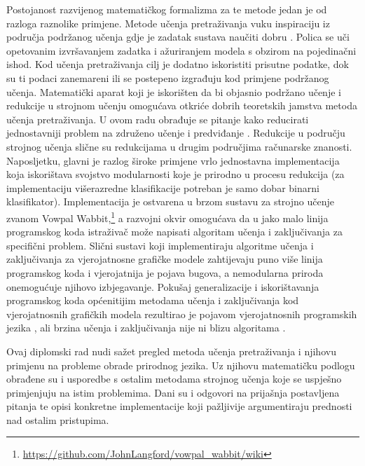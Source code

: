 Postojanost razvijenog matematičkog formalizma za te metode jedan je od razloga
raznolike primjene. Metode učenja pretraživanja vuku inspiraciju iz područja
podržanog učenja  gdje je zadatak sustava naučiti
dobru .
Polica se uči opetovanim izvršavanjem zadatka i ažuriranjem modela s obzirom na
pojedinačni ishod. Kod učenja pretraživanja cilj je dodatno iskoristiti prisutne
podatke, dok su ti podaci zanemareni ili se postepeno izgrađuju kod primjene
podržanog učenja. Matematički aparat koji je iskorišten da bi objasnio podržano
učenje i redukcije u strojnom učenju 
omogućava otkriće dobrih teoretskih jamstva metoda učenja pretraživanja. U ovom
radu obrađuje se pitanje kako reducirati jednostavniji problem na združeno
učenje i predviđanje . Redukcije u području
strojnog učenja slične su redukcijama u drugim područjima računarske znanosti.
Naposljetku, glavni je razlog široke primjene vrlo jednostavna implementacija
koja iskorištava svojstvo modularnosti koje je prirodno u procesu redukcija (za
implementaciju višerazredne klasifikacije potreban je samo dobar binarni
klasifikator). Implementacija je ostvarena u brzom sustavu za strojno učenje
zvanom Vowpal
Wabbit,\footnote{\url{https://github.com/JohnLangford/vowpal_wabbit/wiki}} a
\lts{} razvojni okvir omogućava da u jako malo linija programskog koda
istraživač može napisati algoritam učenja i zaključivanja za specifični problem.
Slični sustavi koji implementiraju algoritme učenja i zaključivanja za
vjerojatnosne grafičke modele zahtijevaju puno više linija programskog koda i
vjerojatnija je pojava bugova, a nemodularna priroda onemogućuje njihovo
izbjegavanje. Pokušaj generalizacije i iskorištavanja programskog koda
općenitijim metodama učenja i zaključivanja kod vjerojatnosnih grafičkih modela
rezultirao je pojavom vjerojatnosnih programskih jezika , ali brzina učenja i zaključivanja nije ni blizu
algoritama \lts{}.

Ovaj diplomski rad nudi sažet pregled metoda učenja pretraživanja i njihovu
primjenu na probleme obrade prirodnog jezika. Uz njihovu matematičku podlogu
obrađene su i usporedbe s ostalim metodama strojnog učenja koje se uspješno
primjenjuju na istim problemima. Dani su i odgovori na prijašnja postavljena
pitanja te opisi konkretne implementacije koji pažljivije argumentiraju
prednosti nad ostalim pristupima.

